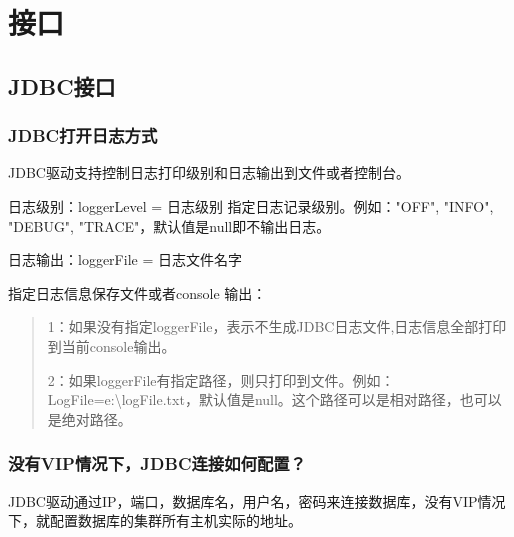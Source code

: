 \documentclass[a4,10pt,oneside,english]{sphinxmanual}
\begin{document}
\begin{sphinxVerbatim}[commandchars=\\\{\}]
\end{sphinxVerbatim}


\chapter{接口}
\label{\detokenize{interface:id1}}\label{\detokenize{interface::doc}}

\section{JDBC接口}
\label{\detokenize{interface/jdbc:jdbc}}\label{\detokenize{interface/jdbc::doc}}

\subsection{JDBC打开日志方式}
\label{\detokenize{interface/jdbc:id1}}
JDBC驱动支持控制日志打印级别和日志输出到文件或者控制台。

日志级别：loggerLevel = 日志级别  指定日志记录级别。例如："OFF", "INFO", "DEBUG", "TRACE"，默认值是null即不输出日志。

日志输出：loggerFile = 日志文件名字

指定日志信息保存文件或者console 输出：
\begin{quote}

1：如果没有指定loggerFile，表示不生成JDBC日志文件,日志信息全部打印到当前console输出。

2：如果loggerFile有指定路径，则只打印到文件。例如：LogFile=e:\textbackslash{}logFile.txt，默认值是null。这个路径可以是相对路径，也可以是绝对路径。
\end{quote}


\subsection{没有VIP情况下，JDBC连接如何配置？}
\label{\detokenize{interface/jdbc:vip-jdbc}}
JDBC驱动通过IP，端口，数据库名，用户名，密码来连接数据库，没有VIP情况下，就配置数据库的集群所有主机实际的地址。
\end{document}
